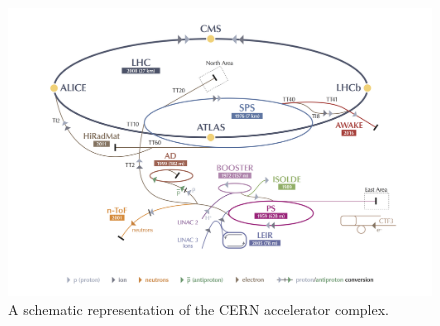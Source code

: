 \begin{figure}[h]
\centering
\includegraphics[width=1.0\textwidth]{figures_chapter2/cern_complex.jpg}
\caption{A schematic representation of the CERN accelerator complex\cite{Haffner:1621894}.}
\label{fig:cern}
\end{figure}




